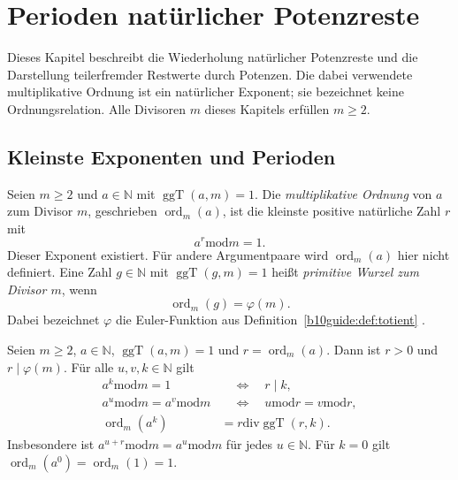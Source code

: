 \chapter{Perioden natürlicher Potenzreste}
\label{b10guide:ch:power-remainders}

Dieses Kapitel beschreibt die Wiederholung natürlicher Potenzreste
und die Darstellung teilerfremder Restwerte durch Potenzen.
Die dabei verwendete multiplikative Ordnung ist ein natürlicher
Exponent; sie bezeichnet keine Ordnungsrelation.
Alle Divisoren $m$ dieses Kapitels erfüllen $m\ge2$.

\section{Kleinste Exponenten und Perioden}

\begin{definition}
\label{b10guide:def:multiplicative-order}
Seien $m\ge2$ und $a\in\mathbb N$ mit $\operatorname{ggT}(a,m)=1$.
Die \emph{multiplikative Ordnung} von $a$ zum Divisor $m$, geschrieben
$\operatorname{ord}_m(a)$, ist die kleinste positive natürliche Zahl
$r$ mit
\[
 a^r\mathbin{\mathrm{mod}}m=1.
\]
Dieser Exponent existiert. Für andere Argumentpaare wird
$\operatorname{ord}_m(a)$ hier nicht definiert.
Eine Zahl $g\in\mathbb N$ mit $\operatorname{ggT}(g,m)=1$ heißt
\emph{primitive Wurzel zum Divisor $m$}, wenn
\[
 \operatorname{ord}_m(g)=\varphi(m).
\]
Dabei bezeichnet $\varphi$ die Euler-Funktion aus
Definition~\ref{b10guide:def:totient} \cite{natlinearrest,natprimroots}.
\end{definition}

\begin{theorem}
\label{b10guide:thm:power-remainder-period}
Seien $m\ge2$, $a\in\mathbb N$, $\operatorname{ggT}(a,m)=1$
und $r=\operatorname{ord}_m(a)$. Dann ist $r>0$ und
$r\mid\varphi(m)$. Für alle $u,v,k\in\mathbb N$ gilt
\cite{natlinearrest}
\[
\begin{aligned}
 a^k\mathbin{\mathrm{mod}}m=1
 &\quad\Longleftrightarrow\quad r\mid k,\\
 a^u\mathbin{\mathrm{mod}}m=a^v\mathbin{\mathrm{mod}}m
 &\quad\Longleftrightarrow\quad
 u\mathbin{\mathrm{mod}}r=v\mathbin{\mathrm{mod}}r,\\
 \operatorname{ord}_m(a^k)
 &=r\mathbin{\mathrm{div}}\operatorname{ggT}(r,k).
\end{aligned}
\]
Insbesondere ist $a^{u+r}\mathbin{\mathrm{mod}}m
=a^u\mathbin{\mathrm{mod}}m$ für jedes $u\in\mathbb N$.
Für $k=0$ gilt $\operatorname{ord}_m(a^0)=\operatorname{ord}_m(1)=1$.
\end{theorem}

